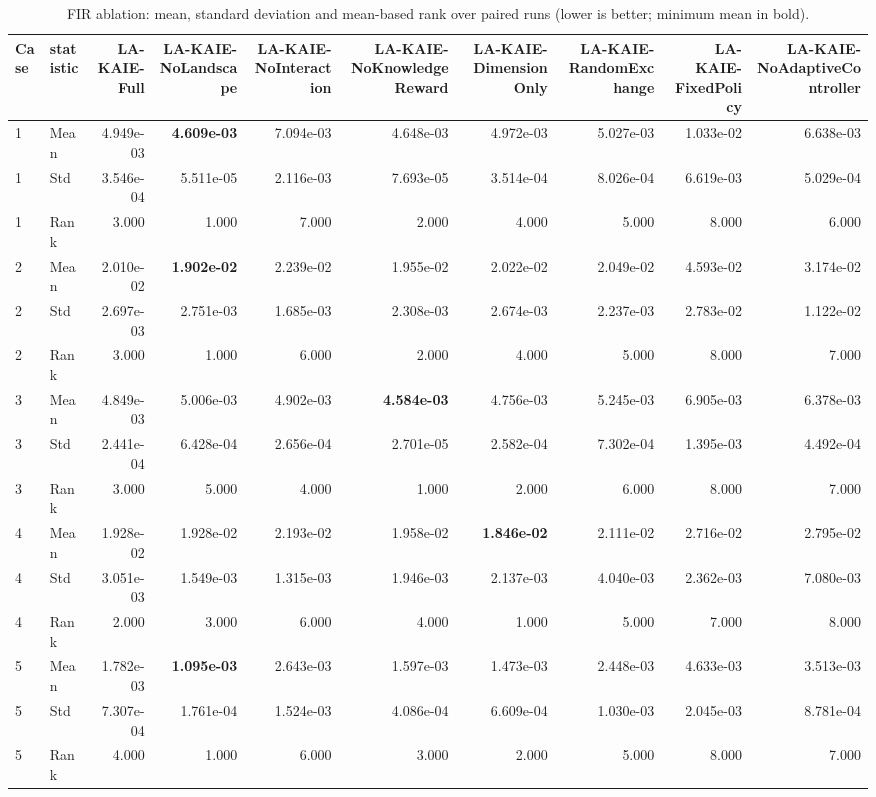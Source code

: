 \begin{table}[t]
\centering
\scriptsize
\caption{FIR ablation: mean, standard deviation and mean-based rank over paired runs (lower is better; minimum mean in bold).}
\label{tab:fir_ablation}
\begin{tabular}{llrrrrrrrr}
\hline
Case & statistic & LA-KAIE-Full & LA-KAIE-NoLandscape & LA-KAIE-NoInteraction & LA-KAIE-NoKnowledgeReward & LA-KAIE-DimensionOnly & LA-KAIE-RandomExchange & LA-KAIE-FixedPolicy & LA-KAIE-NoAdaptiveController \\
\hline
1 & Mean & 4.949e-03 & \textbf{4.609e-03} & 7.094e-03 & 4.648e-03 & 4.972e-03 & 5.027e-03 & 1.033e-02 & 6.638e-03 \\
1 & Std & 3.546e-04 & 5.511e-05 & 2.116e-03 & 7.693e-05 & 3.514e-04 & 8.026e-04 & 6.619e-03 & 5.029e-04 \\
1 & Rank & 3.000 & 1.000 & 7.000 & 2.000 & 4.000 & 5.000 & 8.000 & 6.000 \\
2 & Mean & 2.010e-02 & \textbf{1.902e-02} & 2.239e-02 & 1.955e-02 & 2.022e-02 & 2.049e-02 & 4.593e-02 & 3.174e-02 \\
2 & Std & 2.697e-03 & 2.751e-03 & 1.685e-03 & 2.308e-03 & 2.674e-03 & 2.237e-03 & 2.783e-02 & 1.122e-02 \\
2 & Rank & 3.000 & 1.000 & 6.000 & 2.000 & 4.000 & 5.000 & 8.000 & 7.000 \\
3 & Mean & 4.849e-03 & 5.006e-03 & 4.902e-03 & \textbf{4.584e-03} & 4.756e-03 & 5.245e-03 & 6.905e-03 & 6.378e-03 \\
3 & Std & 2.441e-04 & 6.428e-04 & 2.656e-04 & 2.701e-05 & 2.582e-04 & 7.302e-04 & 1.395e-03 & 4.492e-04 \\
3 & Rank & 3.000 & 5.000 & 4.000 & 1.000 & 2.000 & 6.000 & 8.000 & 7.000 \\
4 & Mean & 1.928e-02 & 1.928e-02 & 2.193e-02 & 1.958e-02 & \textbf{1.846e-02} & 2.111e-02 & 2.716e-02 & 2.795e-02 \\
4 & Std & 3.051e-03 & 1.549e-03 & 1.315e-03 & 1.946e-03 & 2.137e-03 & 4.040e-03 & 2.362e-03 & 7.080e-03 \\
4 & Rank & 2.000 & 3.000 & 6.000 & 4.000 & 1.000 & 5.000 & 7.000 & 8.000 \\
5 & Mean & 1.782e-03 & \textbf{1.095e-03} & 2.643e-03 & 1.597e-03 & 1.473e-03 & 2.448e-03 & 4.633e-03 & 3.513e-03 \\
5 & Std & 7.307e-04 & 1.761e-04 & 1.524e-03 & 4.086e-04 & 6.609e-04 & 1.030e-03 & 2.045e-03 & 8.781e-04 \\
5 & Rank & 4.000 & 1.000 & 6.000 & 3.000 & 2.000 & 5.000 & 8.000 & 7.000 \\

\end{tabular}
\end{table}
